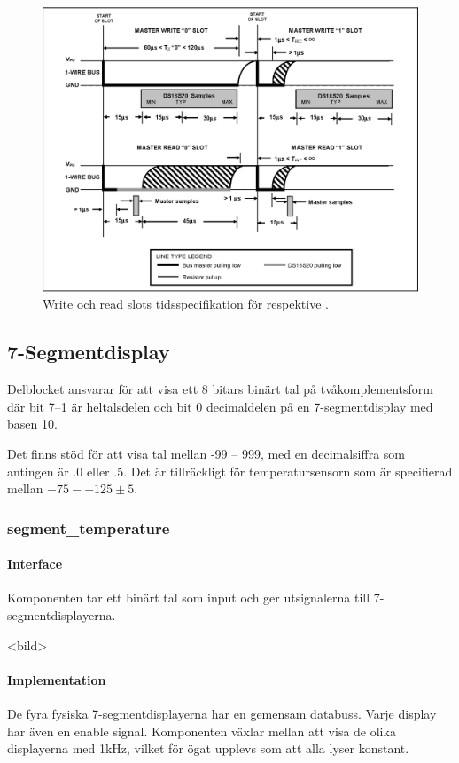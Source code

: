 \begin{figure}
\centering
\includegraphics[width=\textwidth]{write_slot.eps}
\caption{Write och read slots tidsspecifikation för \low{} respektive \high{}.}
\label{fig:rwslots}
\end{figure}



\subsection{7-Segmentdisplay}\label{sec:7seg}
Delblocket ansvarar för att visa ett 8 bitars binärt tal på tvåkomplementsform där bit 7--1 är heltalsdelen och bit 0 decimaldelen på en 7-segmentdisplay med basen 10.

Det finns stöd för att visa tal mellan -99 -- 999, med en decimalsiffra som antingen är .0 eller .5. Det är tillräckligt för temperatursensorn som är specifierad mellan $-75 -- 125 \pm5$.
\subsubsection{segment\_temperature}

\paragraph{Interface}
Komponenten tar ett binärt tal som input och ger utsignalerna till 7-segmentdisplayerna.

<bild>

\paragraph{Implementation}
De fyra fysiska 7-segmentdisplayerna har en gemensam databuss. Varje display har även en enable signal. Komponenten växlar mellan att visa de olika displayerna med 1kHz, vilket för ögat upplevs som att alla lyser konstant.
